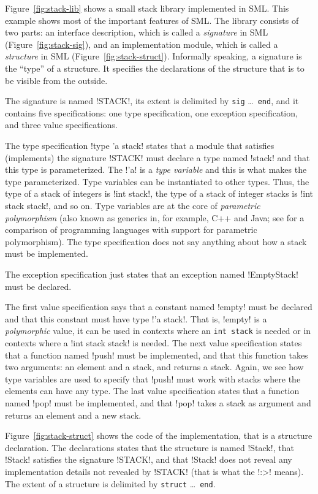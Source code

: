 \documentclass[workingdraft]{usetex-v1}
\begin{document}
Figure~\ref{fig:stack-lib} shows a small stack library implemented in
SML.  This example shows most of the important features of SML.  The
library consists of two parts: an interface description, which is
called a \emph{signature} in SML (Figure~\ref{fig:stack-sig}), and an
implementation module, which is called a \emph{structure} in SML
(Figure~\ref{fig:stack-struct}).  Informally speaking, a
signature is the ``type'' of a structure. It specifies the
declarations of the structure that is to be visible from the outside.


The signature is named !STACK!, its extent is delimited by
\texttt{sig} \ldots\ \texttt{end}, and it contains five
specifications: one type specification, one exception specification,
and three value specifications.

The type specification !type 'a stack! states that a module that
satisfies (implements) the signature !STACK! must declare a type named
!stack! and that this type is parameterized.  The !'a! is a \emph{type
  variable} and this is what makes the type parameterized.  Type
variables can be instantiated to other types.  Thus, the type of a
stack of integers is !int stack!, the type of a stack of integer
stacks is !int stack stack!, and so on. Type variables are at the core of
\emph{parametric polymorphism} (also known as generics in, for
example, C++ and Java; see \cite{garcia03:generics} for a comparison
of programming languages with support for parametric polymorphism).
The type specification does not say anything about how a stack must be
implemented.

The exception specification just states that an exception named
!EmptyStack! must be declared.

The first value specification says that a constant named !empty! must
be declared and that this constant must have type !'a stack!.  That
is, !empty! is a \emph{polymorphic} value, it can be used in contexts
where an \texttt{int stack} is needed or in contexts where a
!int stack stack! is needed.  The next value specification states that a
function named !push! must be implemented, and that this function
takes two arguments: an element and a stack, and returns a stack.
Again, we see how type variables are used to specify that !push! must
work with stacks where the elements can have any type.  The last value
specification states that a function named !pop! must be implemented,
and that !pop!  takes a stack as argument and returns an element and a
new stack.

Figure~\ref{fig:stack-struct} shows the code of the implementation, that is a
structure declaration.  The declarations states
that the structure is named !Stack!, that !Stack! satisfies the
signature !STACK!, and that !Stack! does not reveal any implementation
details not revealed by !STACK! (that is what the !:>! means).  The
extent of a structure is delimited by \texttt{struct} \ldots\ 
\texttt{end}.
\end{document}
